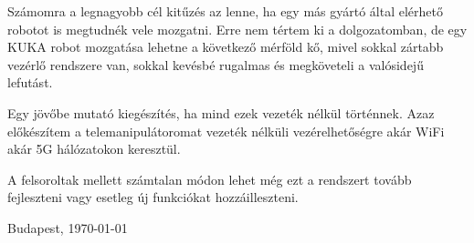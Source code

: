 Számomra a legnagyobb cél kitűzés az lenne, ha egy más gyártó által elérhető robotot is megtudnék vele mozgatni. Erre nem tértem ki a dolgozatomban, de egy KUKA robot mozgatása lehetne a következő mérföld kő, mivel sokkal zártabb vezérlő rendszere van, sokkal kevésbé rugalmas és megköveteli a valósidejű lefutást.

Egy jövőbe mutató kiegészítés, ha mind ezek vezeték nélkül történnek. Azaz előkészítem a telemanipulátoromat vezeték nélküli vezérelhetőségre akár WiFi akár 5G hálózatokon keresztül.

A felsoroltak mellett számtalan módon lehet még ezt a rendszert tovább fejleszteni vagy esetleg új funkciókat hozzáilleszteni.

\vspace{0.5cm}

\begin{flushleft}
{Budapest, \today}
\end{flushleft}

\begin{flushright}
\emph{\authorName}
\end{flushright}

\vfill
